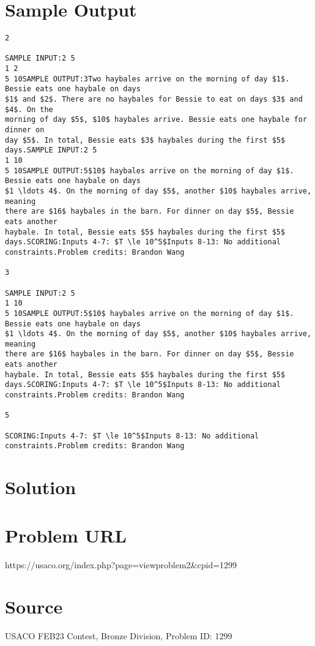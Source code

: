 \documentclass[12pt]{article}
\begin{document}
\section*{Sample Output}
\begin{verbatim}
2

SAMPLE INPUT:2 5
1 2
5 10SAMPLE OUTPUT:3Two haybales arrive on the morning of day $1$. Bessie eats one haybale on days
$1$ and $2$. There are no haybales for Bessie to eat on days $3$ and $4$. On the
morning of day $5$, $10$ haybales arrive. Bessie eats one haybale for dinner on
day $5$. In total, Bessie eats $3$ haybales during the first $5$ days.SAMPLE INPUT:2 5
1 10
5 10SAMPLE OUTPUT:5$10$ haybales arrive on the morning of day $1$. Bessie eats one haybale on days
$1 \ldots 4$. On the morning of day $5$, another $10$ haybales arrive, meaning
there are $16$ haybales in the barn. For dinner on day $5$, Bessie eats another
haybale. In total, Bessie eats $5$ haybales during the first $5$ days.SCORING:Inputs 4-7: $T \le 10^5$Inputs 8-13: No additional constraints.Problem credits: Brandon Wang

3

SAMPLE INPUT:2 5
1 10
5 10SAMPLE OUTPUT:5$10$ haybales arrive on the morning of day $1$. Bessie eats one haybale on days
$1 \ldots 4$. On the morning of day $5$, another $10$ haybales arrive, meaning
there are $16$ haybales in the barn. For dinner on day $5$, Bessie eats another
haybale. In total, Bessie eats $5$ haybales during the first $5$ days.SCORING:Inputs 4-7: $T \le 10^5$Inputs 8-13: No additional constraints.Problem credits: Brandon Wang

5

SCORING:Inputs 4-7: $T \le 10^5$Inputs 8-13: No additional constraints.Problem credits: Brandon Wang
\end{verbatim}

\section*{Solution}


\section*{Problem URL}
https://usaco.org/index.php?page=viewproblem2&cpid=1299

\section*{Source}
USACO FEB23 Contest, Bronze Division, Problem ID: 1299
\end{document}
